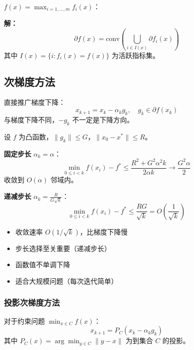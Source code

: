\begin{example}[最大值函数的次微分]
$f(x) = \max_{i=1,\ldots,m} f_i(x)$：

\textbf{解：}
\[
\partial f(x) = \text{conv}\left(\bigcup_{i \in I(x)} \partial f_i(x)\right)
\]
其中 $I(x) = \{i : f_i(x) = f(x)\}$ 为活跃指标集。
\end{example}

\subsection{次梯度方法}\label{sec:subgradient-method}

\begin{conceptbox}[次梯度方法]
直接推广梯度下降：
\[
x_{k+1} = x_k - \alpha_k g_k, \quad g_k \in \partial f(x_k)
\]
与梯度下降不同，$-\!g_k$ 不一定是下降方向。
\end{conceptbox}

\begin{theorem}[次梯度方法的收敛性]
设 $f$ 为凸函数，$\|g_k\| \leq G$，$\|x_0 - x^*\| \leq R$。

\textbf{固定步长} $\alpha_k = \alpha$：
\[
\min_{0 \leq i < k} f(x_i) - f^* \leq \frac{R^2 + G^2 \alpha^2 k}{2\alpha k} \to \frac{G^2 \alpha}{2}
\]
收敛到 $O(\alpha)$ 邻域内。

\textbf{递减步长} $\alpha_k = \frac{R}{G\sqrt{k}}$：
\[
\min_{0 \leq i < k} f(x_i) - f^* \leq \frac{RG}{\sqrt{k}} = O\left(\frac{1}{\sqrt{k}}\right)
\]
\end{theorem}

\begin{notebox}[次梯度方法的特点]
\begin{itemize}
    \item 收敛速率 $O(1/\sqrt{k})$，比梯度下降慢
    \item 步长选择至关重要（递减步长）
    \item 函数值不单调下降
    \item 适合大规模问题（每次迭代简单）
\end{itemize}
\end{notebox}

\subsubsection{投影次梯度方法}

对于约束问题 $\min_{x \in C} f(x)$：
\[
x_{k+1} = P_C(x_k - \alpha_k g_k)
\]
其中 $P_C(x) = \arg\min_{y \in C} \|y - x\|$ 为到集合 $C$ 的投影。

